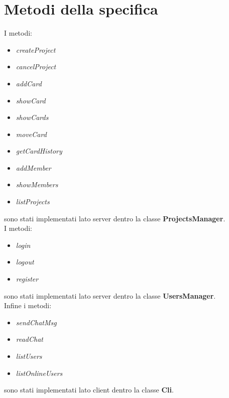 \documentclass[11pt]{report}
\begin{document}
	\section{Metodi della specifica}
	I metodi:
		\begin{itemize}
			\item \textit{createProject}
			\item \textit{cancelProject}
			\item \textit{addCard}
			\item \textit{showCard}
			\item \textit{showCards}
			\item \textit{moveCard}
			\item \textit{getCardHistory}
			\item \textit{addMember}
			\item \textit{showMembers}
			\item \textit{listProjects}
		\end{itemize}
	sono stati implementati lato server dentro la classe \textbf{ProjectsManager}.\\
	I metodi:
		\begin{itemize}
			\item \textit{login}
			\item \textit{logout}
			\item \textit{register}
		\end{itemize}
	sono stati implementati lato server dentro la classe \textbf{UsersManager}. \\
	Infine i metodi:
		\begin{itemize}
			\item \textit{sendChatMsg}
			\item \textit{readChat}
			\item \textit{listUsers}
			\item \textit{listOnlineUsers}
		\end{itemize}
	sono stati implementati lato client dentro la classe \textbf{Cli}.
	
\end{document}
